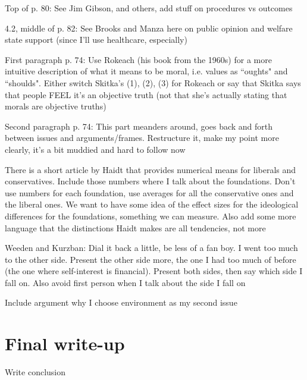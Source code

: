 \documentclass[12pt]{article}
\begin{document}
\begin{coi}
		\item Top of p. 80:  See Jim Gibson, and others, add stuff on procedures vs outcomes
		\item 4.2, middle of p. 82: See Brooks and Manza here on public opinion and welfare state support (since I'll use healthcare, especially)
		\item First paragraph p. 74: Use Rokeach (his book from the 1960s) for a more intuitive description of what it means to be moral, i.e. values as ``oughts" and ``shoulds". Either switch Skitka's (1), (2), (3) for Rokeach or say that Skitka says that people FEEL it's an objective truth (not that she's actually stating that morals are objective truths)
		\item Second paragraph p. 74: This part meanders around, goes back and forth between issues and arguments/frames. Restructure it, make my point more clearly, it's a bit muddied and hard to follow now
		\item There is a short article by Haidt that provides numerical means for liberals and conservatives. Include those numbers where I talk about the foundations. Don't use numbers for each foundation, use averages for all the conservative ones and the liberal ones. We want to have some idea of the effect sizes for the ideological differences for the foundations, something we can measure. Also add some more language that the distinctions Haidt makes are all tendencies, not more
		\item Weeden and Kurzban: Dial it back a little, be less of a fan boy. I went too much to the other side. Present the other side more, the one I had too much of before (the one where self-interest is financial). Present both sides, then say which side I fall on. Also avoid first person when I talk about the side I fall on
		\item Include argument why I choose environment as my second issue
	\end{coi}


\section*{Final write-up}
	\begin{coi}
		\item Write conclusion
	\end{coi}
\end{document}
